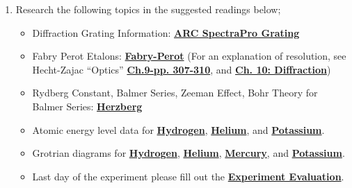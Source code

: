 \documentclass{../lab}
\begin{document}
\begin{enumerate}

    \item Research the following topics in the suggested readings below;
    
    \begin{itemize}
        \item Diffraction Grating Information: \href{https://drive.google.com/file/d/1l4AXCnHn_V4o1zIaso1frvO9z5U2PkAx/view?usp=drive_link}{\textbf{ARC SpectraPro Grating}}
        
        \item Fabry Perot Etalons: \href{https://drive.google.com/file/d/1OeIjmG3ibyWh8FBix_1Bb9S8dFVAEwx-/view?usp=drive_link}{\textbf{Fabry-Perot}} (For an explanation of resolution, see Hecht-Zajac ``Optics'' \href{https://drive.google.com/file/d/1hFNC70EqjBrIGizqtXumE0ORwrSxaKQW/view?usp=drive_link}{\textbf{Ch.9-pp. 307-310}}, and \href{https://drive.google.com/file/d/1Qdw9D6ocLnP8t8HyDsPdPkN7QHzRoKrn/view?usp=drive_link}{\textbf{Ch. 10: Diffraction}})
        
        \item Rydberg Constant, Balmer Series, Zeeman Effect, Bohr Theory for Balmer Series: \href{https://drive.google.com/file/d/1WSyJRwUKQZkj335oLa1WTh3_NwQC4f2T/view?usp=drive_link}{\textbf{Herzberg}} 
    
        \item Atomic energy level data for  \href{https://drive.google.com/file/d/1e1Y6Obc4rOvVuz0TtyEQyqV_nuypqg3Z/view?usp=drive_link}{\textbf{Hydrogen}},  \href{https://drive.google.com/file/d/1uO83LOrWNWJlQmFlDo8dnueioUUUC-lk/view?usp=drive_link}{\textbf{Helium}}, and \href{https://drive.google.com/file/d/1ohgLKxY6FfHfkCFCy2FMOUhGtgcdoN0M/view?usp=drive_link}{\textbf{Potassium}}.

        \item Grotrian diagrams for   \href{https://drive.google.com/file/d/1iCHMIXsogEOOOzBwfW4NHi2zcSaKj17v/view?usp=drive_link}{\textbf{Hydrogen}}, 
        \href{https://drive.google.com/file/d/11IOoCpf-Z6qa2fpMzYJcjporHbX_kVvy/view?usp=drive_link}{\textbf{Helium}}, \href{https://drive.google.com/file/d/11eeswgP7qK2aozNi78FRqtPxO8qeRx4t/view?usp=drive_link}{\textbf{Mercury}}, and \href{https://drive.google.com/file/d/1xyZ_pPd34qs5YeHy0uI2LLcRUE6QNtfR/view?usp=drive_link}{\textbf{Potassium}}.
        
    
        \item Last day of the experiment please fill out the \href{\ExperimentEvaluation}{\textbf{Experiment Evaluation}}.
    
    \end{itemize}
\end{enumerate}
\end{document}
